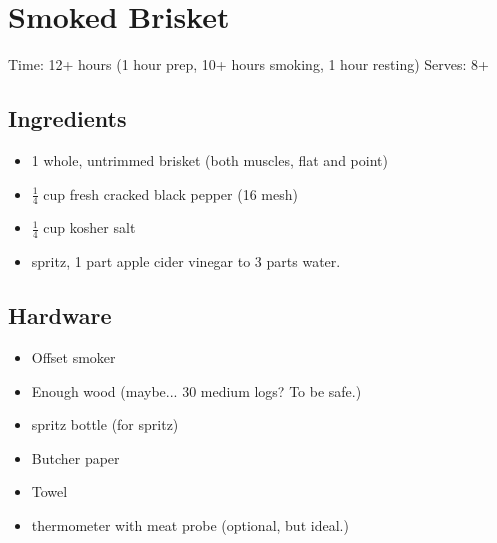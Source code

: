 \section{Smoked Brisket}
\label{smokedBrisket}
\setcounter{secnumdepth}{0}
Time: 12+ hours (1 hour prep, 10+ hours smoking, 1 hour resting)
Serves: 8+

\begin{multicols}{2}
\subsection*{Ingredients}
\begin{itemize}
    \item 1 whole, untrimmed brisket (both muscles, flat and point)
    \item \( \frac{1}{4} \) cup fresh cracked black pepper (16 mesh)
    \item \( \frac{1}{4} \) cup kosher salt
    \item spritz, 1 part apple cider vinegar to 3 parts water.
\end{itemize}

\subsection*{Hardware}
\begin{itemize}
    \item Offset smoker
    \item Enough wood (maybe... 30 medium logs? To be safe.)
    \item spritz bottle (for spritz)
    \item Butcher paper
    \item Towel
    \item thermometer with meat probe (optional, but ideal.)
\end{itemize}
\clearpage


\end{multicols}
